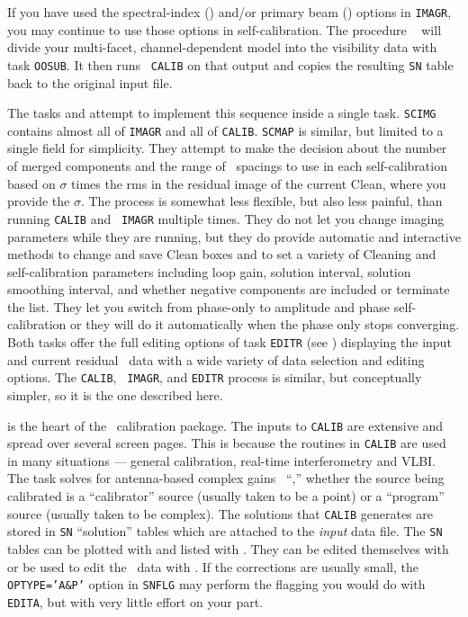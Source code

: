      If you have used the spectral-index () and/or
primary beam () options in {\tt IMAGR}, you may continue
to use those options in self-calibration.  The procedure {\tt
{}} will divide your multi-facet, channel-dependent model
into the visibility data with task {\tt OOSUB}\@.  It then runs {\tt
CALIB} on that output and copies the resulting {\tt SN} table back to
the original input file.

     The tasks {\tt {}} and {\tt {}} attempt to
implement this sequence inside a single task.  {\tt SCIMG} contains
almost all of {\tt IMAGR} and all of {\tt CALIB}\@.  {\tt SCMAP}
is similar, but limited to a single field for simplicity.  They
attempt to make the decision about the number of merged components and
the range of \uv\ spacings to use in each self-calibration based on
$\sigma$ times the rms in the residual image of the current Clean,
where you provide the $\sigma$.  The process is somewhat less
flexible, but also less painful, than running {\tt CALIB} and {\tt
IMAGR} multiple times.  They do not let you change imaging parameters
while they are running, but they do provide automatic and interactive
methods to change and save Clean boxes and to set a variety of
Cleaning and self-calibration parameters including loop gain, solution
interval, solution smoothing interval, and whether negative components
are included or terminate the list.  They let you switch from
phase-only to amplitude and phase self-calibration or they will do it
automatically when the phase only stops converging.  Both tasks offer
the full editing options of task {\tt EDITR} (see )
displaying the input and current residual \uv\ data with a wide
variety of data selection and editing options.  The {\tt CALIB}, {\tt
IMAGR}, and {\tt EDITR} process is similar, but conceptually simpler,
so it is the one described here.


    {\tt {}} is the heart of the \AIPS\ calibration package.
The inputs to {\tt CALIB} are extensive and spread over several screen
pages.  This is because the routines in {\tt CALIB} are used in many
situations --- general calibration, real-time interferometry and
VLBI\@.  The task solves for antenna-based complex gains \ie\
``,'' whether the source being calibrated is a
``calibrator'' source (usually taken to be a point) or a ``program''
source (usually taken to be complex).  The solutions that {\tt CALIB}
generates are stored in {\tt SN} ``solution'' tables which are
attached to the {\it input\/} data file.  The {\tt SN} tables can be
plotted with {\tt \tndx{SNPLT}} and listed with {\tt \tndx{LISTR}}\@.
They can be edited themselves with {\tt \tndx{SNEDT}} or be used to
edit the \uv\ data with {\tt \tndx{EDITA}}\@.  If the corrections are
usually small, the {\tt OPTYPE='A\&P'} option in {\tt SNFLG} may
perform the flagging you would do with {\tt EDITA}, but with very
little effort on your part.

